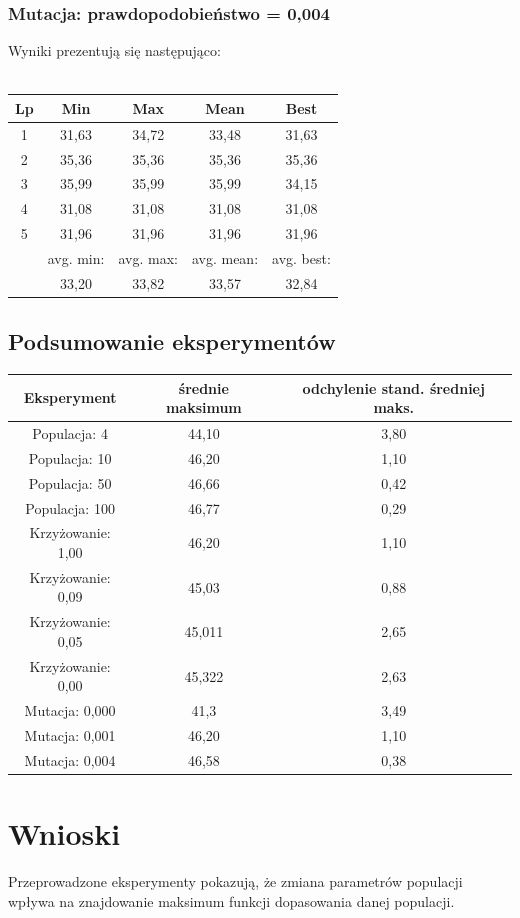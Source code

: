 \documentclass[a4paper,11pt]{article}
\begin{document}
				\subsubsection{Mutacja: prawdopodobieństwo = 0,004}
					Wyniki prezentują się następująco:\\~\\
					\begin{tabular}{|c|c|c|c|c|}
						\hline 
						Lp & Min & Max & Mean & Best \\
						\hline
						1 & 31,63  & 34,72 & 33,48 & 31,63\\\hline
						2 & 35,36 & 35,36  &35,36 & 35,36 \\\hline
						3 & 35,99 & 35,99  & 35,99 &34,15 \\\hline
						4 & 31,08 & 31,08  & 31,08& 31,08 \\\hline
						5 & 31,96 & 31,96  & 31,96 & 31,96\\\hline
						&avg. min:&avg. max:&avg. mean:&avg. best:\\\hline
						& 33,20 & 33,82& 33,57 &32,84\\\hline
					\end{tabular} 
			\subsection{Podsumowanie eksperymentów}
			\begin{tabular}{|c|c|c|}
				\hline
				Eksperyment & średnie maksimum & odchylenie stand. średniej maks. \\\hline
				Populacja: 4  & 44,10 & 3,80\\\hline
				Populacja: 10 &46,20 &1,10 \\\hline
				Populacja: 50 & 46,66& 0,42\\\hline
				Populacja: 100&46,77 &0,29\\\hline
				Krzyżowanie: 1,00& 46,20 & 1,10 \\\hline
				Krzyżowanie: 0,09& 45,03 & 0,88 \\\hline
				Krzyżowanie: 0,05& 45,011 &2,65 \\\hline
				Krzyżowanie: 0,00&  45,322 & 2,63\\\hline
				Mutacja: 0,000& 41,3 & 3,49\\\hline
				Mutacja: 0,001& 46,20 & 1,10\\\hline
				Mutacja: 0,004& 46,58& 0,38 \\\hline
			\end{tabular}
	\section{Wnioski}
		Przeprowadzone eksperymenty pokazują, że zmiana parametrów populacji wpływa na znajdowanie maksimum funkcji dopasowania danej populacji. 
\end{document}
